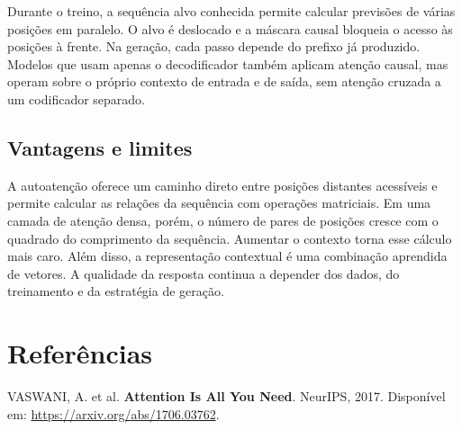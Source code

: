 \documentclass[12pt,a4paper]{article}
\begin{document}
Durante o treino, a sequência alvo conhecida permite calcular previsões de várias posições em paralelo. O alvo é deslocado e a máscara causal bloqueia o acesso às posições à frente. Na geração, cada passo depende do prefixo já produzido. Modelos que usam apenas o decodificador também aplicam atenção causal, mas operam sobre o próprio contexto de entrada e de saída, sem atenção cruzada a um codificador separado.

\subsection{Vantagens e limites}

A autoatenção oferece um caminho direto entre posições distantes acessíveis e permite calcular as relações da sequência com operações matriciais. Em uma camada de atenção densa, porém, o número de pares de posições cresce com o quadrado do comprimento da sequência. Aumentar o contexto torna esse cálculo mais caro. Além disso, a representação contextual é uma combinação aprendida de vetores. A qualidade da resposta continua a depender dos dados, do treinamento e da estratégia de geração.

\section*{Referências}

\noindent [1] VASWANI, A. et al. \textbf{Attention Is All You Need}. NeurIPS, 2017. Disponível em: \url{https://arxiv.org/abs/1706.03762}.
\end{document}
